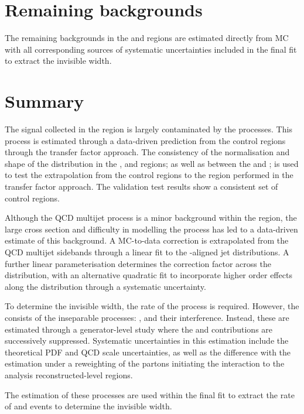 \section{Remaining backgrounds}

The remaining backgrounds in the \metplusjets and \diellplusjets regions are estimated directly from MC with all corresponding sources of systematic uncertainties included in the final fit to extract the \PZ invisible width.


\section{Summary}

The \IZvvj signal collected in the \metplusjets region is largely contaminated by the \IWlvj processes. This process is estimated through a data-driven prediction from the \ellplusjets control regions through the transfer factor approach. The consistency of the normalisation and shape of the \recoil distribution in the \muplusjets, \eleplusjets and \tauplusjets regions; as well as between the \mupplusjets and \munplusjets; is used to test the extrapolation from the control regions to the \metplusjets region performed in the transfer factor approach. The validation test results show a consistent set of control regions.

Although the QCD multijet process is a minor background within the \metplusjets region, the large cross section and difficulty in modelling the process has led to a data-driven estimate of this background. A MC-to-data correction is extrapolated from the QCD multijet sidebands through a linear fit to the \ptmiss-aligned jet \pt distributions. A further linear parameterisation determines the correction factor across the \recoil distribution, with an alternative quadratic fit to incorporate higher order effects along the \recoil distribution through a systematic uncertainty.

To determine the \PZ invisible width, the rate of the \IZll process is required. However, the \diellplusjets consists of the inseparable processes: \IZll, \Igstarll and their interference. Instead, these are estimated through a generator-level study where the \PZ and \Pgstar contributions are successively suppressed. Systematic uncertainties in this estimation include the theoretical PDF and QCD scale uncertainties, as well as the difference with the estimation under a reweighting of the partons initiating the interaction to the analysis reconstructed-level regions.

The estimation of these processes are used within the final fit to extract the rate of \IZvvj and \IZllj events to determine the \PZ invisible width.
